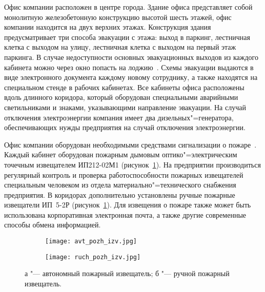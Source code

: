 Офис компании расположен в центре города.
Здание офиса представляет собой монолитную железобетонную конструкцию высотой шесть этажей, офис компании находится на двух верхних этажах.
Конструкция здания предусматривает три способа эвакуации с этажа: выход в паркинг, лестничная клетка с выходом на улицу, лестничная клетка с выходом на первый этаж паркинга. 
В случае недоступности основных эвакуационных выходов из каждого кабинета можно через окно попасть на лоджию~\cite[\ignore{раздел~5.5.4,} с.~314\,--\,316]{michnuk_2009}.
Схемы эвакуации выдаются в виде электронного документа каждому новому сотруднику, а также находятся на специальном стенде в рабочих кабинетах.
Все кабинеты офиса расположены вдоль длинного коридора, который оборудован специальными аварийными светильниками и знаками, указывающими направление эвакуации.
На случай отключения электроэнергии компания имеет два дизельных"=генератора, обеспечивающих нужды предприятия на случай отключения электроэнергии.

Офис компании оборудован необходимыми средствами сигнализации о пожаре~\cite[с.~215]{sinilov_2010}. %
Каждый кабинет оборудован пожарным дымовым оптико"=электрическим точечным извещателем \mbox{ИП212-02М1} (рисунок~\ref{fig:fire_alarms}).
На предприятии производиться регулярный контроль и проверка работоспособности пожарных извещателей специальным человеком из отдела материально"=технического снабжения предприятия.
В коридорах дополнительно установлены ручные пожарные извещатели \mbox{ИП 5-2Р} (рисунок~\ref{fig:fire_alarms}).
Для извещения о пожаре также может быть использована корпоративная электронная почта, а также другие современные способы обмена информацией.

\begin{figure}[ht]
\centering
  \begin{subfigure}[b]{0.45\textwidth} 
    \centering
    \texttt{[image: avt\_pozh\_izv.jpg]}  
    \caption{}
  \end{subfigure}
  \begin{subfigure}[b]{0.45\textwidth} 
    \centering
    \texttt{[image: ruch\_pozh\_izv.jpg]}  
    \caption{}
  \end{subfigure}
  \caption{ а "--- автономный пожарный извещатель;
            б "--- ручной пожарный извещатель.}
  \label{fig:fire_alarms}
\end{figure}

